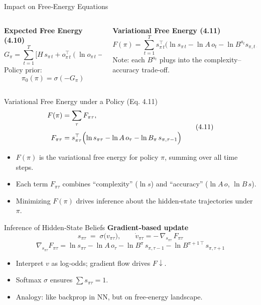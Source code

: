 \documentclass[aspectratio=1610, english]{beamer}
\begin{document}
\begin{frame}{Impact on Free‐Energy Equations}
\begin{columns}[t]
  \begin{column}{0.48\textwidth}
    \textbf{Expected Free Energy (4.10)}  
    \[
      G_\pi
      = \sum_{t=1}^T
        \bigl[H\,s_{\pi\,t}
        + o_{\pi\,t}^\top(\ln o_{\pi\,t}-\ln C_t)\bigr]
    \]
    Policy prior:
    \[
      \pi_0(\pi)=\sigma(-G_\pi)
    \]
  \end{column}
  \begin{column}{0.48\textwidth}
    \textbf{Variational Free Energy (4.11)}  
    \[
      F(\pi)
      = \sum_{t=1}^T
        s_{\pi\,t}^\top\bigl(\ln s_{\pi\,t}
        -\ln A\,o_t
        -\ln B^{a_t}s_{\pi,t-1}\bigr)
    \]
    Note: each \(B^{a_t}\) plugs into the complexity–accuracy trade‐off.
  \end{column}
\end{columns}
\end{frame}

\begin{frame}{Variational Free Energy under a Policy (Eq. 4.11)}
\[
\begin{aligned}
F(\pi) &= \sum_{\tau} F_{\pi\tau}, \\[4pt]
F_{\pi\tau}
&= 
s_{\pi\tau}^\top
\Bigl(\ln s_{\pi\tau} - \ln A\,o_\tau - \ln B_\pi\,s_{\pi,\tau-1}\Bigr)
\end{aligned}
\tag{4.11}
\]
\begin{itemize}
  \item \(F(\pi)\) is the variational free energy for policy \(\pi\), summing over all time steps.  
  \item Each term \(F_{\pi\tau}\) combines “complexity” (\(\ln s\)) and “accuracy” (\(\ln A\,o\), \(\ln B\,s\)).  
  \item Minimizing \(F(\pi)\) drives inference about the hidden‐state trajectories under \(\pi\).  
\end{itemize}
\end{frame}

\begin{frame}{Inference of Hidden‐State Beliefs}
    \textbf{Gradient‐based update}
    \[
      s_{\pi\tau} \;=\;\sigma\bigl(v_{\pi\tau}\bigr), 
      \qquad
      \dot v_{\pi\tau}
      = -\,\nabla_{s_{\pi\tau}}\,F_{\pi\tau}
    \]
    \[
      \nabla_{s_{\pi\tau}}F_{\pi\tau}
      = \ln s_{\pi\tau}
        - \ln A\,o_{\tau}
        - \ln B^{\pi}\,s_{\pi,\tau-1}
        - \ln B^{\pi+1\,\top}\,s_{\pi,\tau+1}
    \]
    \begin{itemize}
      \item Interpret \(v\) as log‑odds; gradient flow drives \(F\downarrow\).  
      \item Softmax \(\sigma\) ensures \(\sum s_{\pi\tau}=1\).  
      \item Analogy: like backprop in NN, but on free‑energy landscape.  
    \end{itemize}
\end{frame}
\end{document}
